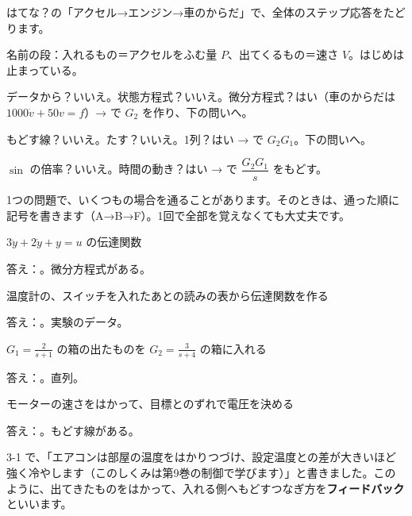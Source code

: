 はてな？の「アクセル→エンジン→車のからだ」で、全体のステップ応答をたどります。
\begin{enumerate}[label={\bkcircled[\bkTT]{\arabic*}}, leftmargin=2.4\zw, itemsep=1pt, topsep=2pt]
\item 名前の段：入れるもの＝アクセルをふむ量 $P$、出てくるもの＝速さ $V$。はじめは止まっている。
\item データから？\enspace いいえ。\enspace 状態方程式？\enspace いいえ。\enspace 微分方程式？\enspace はい（車のからだは $1000\dot v+50v=f$）→  で $G_2$ を作り、下の問いへ。
\item もどす線？\enspace いいえ。\enspace たす？\enspace いいえ。\enspace 1列？\enspace はい →  で $G_2G_1$。下の問いへ。
\item $\sin$ の倍率？\enspace いいえ。\enspace 時間の動き？\enspace はい →  で $\dfrac{G_2G_1}{s}$ をもどす。
\end{enumerate}
1つの問題で、いくつもの場合を通ることがあります。そのときは、通った順に記号を書きます（A→B→F）。1回で全部を覚えなくても大丈夫です。

\begin{enumerate}[label={\bkcircled[\bkTT]{\arabic*}}, leftmargin=2.4\zw, itemsep=3pt, topsep=2pt]
\item $3\ddot y+2\dot y+y=u$ の伝達関数\par\nobreak\noindent 答え：。微分方程式がある。
\item 温度計の、スイッチを入れたあとの読みの表から伝達関数を作る\par\nobreak\noindent 答え：。実験のデータ。
\item $G_1=\tfrac{2}{s+1}$ の箱の出たものを $G_2=\tfrac{3}{s+4}$ の箱に入れる\par\nobreak\noindent 答え：。直列。
\item モーターの速さをはかって、目標とのずれで電圧を決める\par\nobreak\noindent 答え：。もどす線がある。
\end{enumerate}


\label{bk:9-8:fb}3-1 で、「エアコンは部屋の温度をはかりつづけ、設定温度との差が大きいほど強く冷やします（このしくみは第9巻の制御で学びます）」と書きました。このように、出てきたものをはかって、入れる側へもどすつなぎ方を\textbf{フィードバック}といいます。

